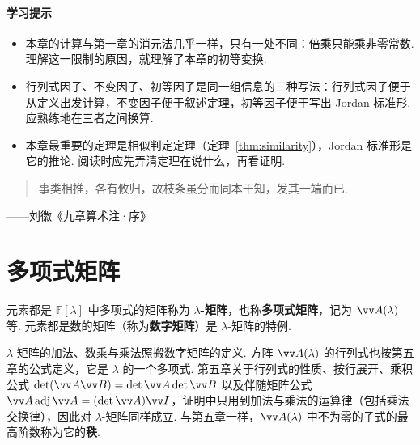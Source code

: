 	\paragraph*{学习提示}
	\begin{itemize}
		\item 本章的计算与第一章的消元法几乎一样，只有一处不同：倍乘只能乘非零常数. 理解这一限制的原因，就理解了本章的初等变换.
		\item 行列式因子、不变因子、初等因子是同一组信息的三种写法：行列式因子便于从定义出发计算，不变因子便于叙述定理，初等因子便于写出 Jordan 标准形. 应熟练地在三者之间换算.
		\item 本章最重要的定理是相似判定定理（定理~\ref{thm:similarity}），Jordan 标准形是它的推论. 阅读时应先弄清定理在说什么，再看证明.
	\end{itemize}
	
	\newpage
	
	\begin{tcolorbox}[epigraph]
		\begin{quote}事类相推，各有攸归，故枝条虽分而同本干知，发其一端而已.\end{quote}
		\begin{flushright}——刘徽《九章算术注·序》\footnotemark\end{flushright}
	\end{tcolorbox}
	
	\section{\hB 多项式矩阵}\label{sec:lambdamat}
	
	\begin{definition}
		元素都是 $\mathbb{F}[\lambda]$ 中多项式的矩阵称为 \textbf{$\lambda$-矩阵}，也称\textbf{多项式矩阵}，记为 $\vv A(\lambda)$ 等. 元素都是数的矩阵（称为\textbf{数字矩阵}）是 $\lambda$-矩阵的特例.
	\end{definition}
	
	$\lambda$-矩阵的加法、数乘与乘法照搬数字矩阵的定义. 方阵 $\vv A(\lambda)$ 的行列式也按第五章的公式定义，它是 $\lambda$ 的一个多项式. 第五章关于行列式的性质、按行展开、乘积公式 $\det(\vv A\vv B)=\det\vv A\det\vv B$ 以及伴随矩阵公式 $\vv A\operatorname{adj}\vv A=(\det\vv A)\vv I$，证明中只用到加法与乘法的运算律（包括乘法交换律），因此对 $\lambda$-矩阵同样成立. 与第五章一样，$\vv A(\lambda)$ 中不为零的子式的最高阶数称为它的\textbf{秩}.
	

